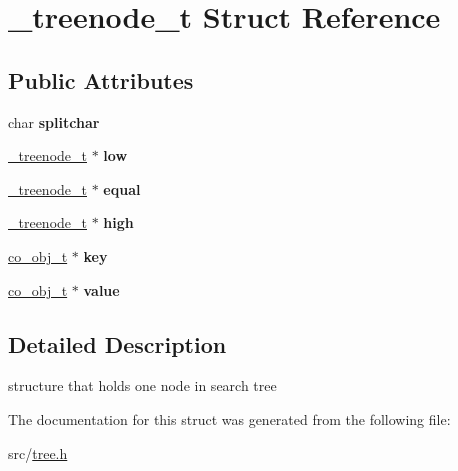 \hypertarget{struct__treenode__t}{\section{\+\_\+treenode\+\_\+t Struct Reference}
\label{struct__treenode__t}
}
\subsection*{Public Attributes}
\begin{DoxyCompactItemize}
\item 
\hypertarget{struct__treenode__t_a9089b5d471580a0ef77e47f4261bb9d3}{char {\bfseries splitchar}}\label{struct__treenode__t_a9089b5d471580a0ef77e47f4261bb9d3}

\item 
\hypertarget{struct__treenode__t_aa73e5f37998912d04a24f9106c70762e}{\hyperlink{struct__treenode__t}{\+\_\+treenode\+\_\+t} $\ast$ {\bfseries low}}\label{struct__treenode__t_aa73e5f37998912d04a24f9106c70762e}

\item 
\hypertarget{struct__treenode__t_aebfbeddd8670ad12dcd94e1483a2ea8f}{\hyperlink{struct__treenode__t}{\+\_\+treenode\+\_\+t} $\ast$ {\bfseries equal}}\label{struct__treenode__t_aebfbeddd8670ad12dcd94e1483a2ea8f}

\item 
\hypertarget{struct__treenode__t_ab0aa90950153cde8e10454615a94a381}{\hyperlink{struct__treenode__t}{\+\_\+treenode\+\_\+t} $\ast$ {\bfseries high}}\label{struct__treenode__t_ab0aa90950153cde8e10454615a94a381}

\item 
\hypertarget{struct__treenode__t_ade0dc24afec0dc16b8345d353241a88f}{\hyperlink{structco__obj__t}{co\+\_\+obj\+\_\+t} $\ast$ {\bfseries key}}\label{struct__treenode__t_ade0dc24afec0dc16b8345d353241a88f}

\item 
\hypertarget{struct__treenode__t_a28e0f88580b336f9924edf26c364aa9c}{\hyperlink{structco__obj__t}{co\+\_\+obj\+\_\+t} $\ast$ {\bfseries value}}\label{struct__treenode__t_a28e0f88580b336f9924edf26c364aa9c}

\end{DoxyCompactItemize}


\subsection{Detailed Description}
structure that holds one node in search tree 

The documentation for this struct was generated from the following file\+:\begin{DoxyCompactItemize}
\item 
src/\hyperlink{tree_8h}{tree.\+h}\end{DoxyCompactItemize}
